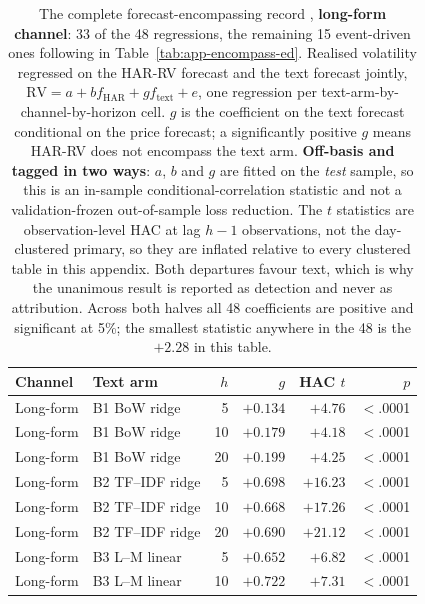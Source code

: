\begin{table}[p]
\centering
\caption[The 48 encompassing regressions, long-form half]{The complete
forecast-encompassing record \cite{harvey1998encompassing}, \textbf{long-form
channel}: 33 of the 48 regressions, the remaining 15 event-driven ones
following in Table~\ref{tab:app-encompass-ed}. Realised
volatility regressed on the HAR-RV forecast and the text forecast jointly,
$\mathrm{RV} = a + b f_{\mathrm{HAR}} + g f_{\mathrm{text}} + e$, one
regression per text-arm-by-channel-by-horizon cell. $g$ is the coefficient
on the text forecast conditional on the price forecast; a significantly
positive $g$ means HAR-RV does not encompass the text arm.
\textbf{Off-basis and tagged in two ways}: $a$, $b$ and $g$ are fitted on
the \emph{test} sample, so this is an in-sample conditional-correlation
statistic and not a validation-frozen out-of-sample loss reduction. The
$t$ statistics are observation-level HAC at lag $h-1$ observations, not the
day-clustered primary, so they are inflated relative to every clustered
table in this appendix. Both departures favour text, which is why the
unanimous result is reported as detection and never as attribution. Across
both halves all 48 coefficients are positive and significant at 5\%; the
smallest statistic anywhere in the 48 is the $+2.28$ in this table.}
\label{tab:app-encompass}
\singlespacing\footnotesize
\setlength{\tabcolsep}{4pt}
\begin{tabular}{@{}llrrrr@{}}
\toprule
Channel & Text arm & $h$ & $g$ & HAC $t$ & $p$ \\
\midrule
Long-form & B1 BoW ridge & 5 & $+0.134$ & $+4.76$ & $<$.0001 \\
Long-form & B1 BoW ridge & 10 & $+0.179$ & $+4.18$ & $<$.0001 \\
Long-form & B1 BoW ridge & 20 & $+0.199$ & $+4.25$ & $<$.0001 \\
\addlinespace
Long-form & B2 TF--IDF ridge & 5 & $+0.698$ & $+16.23$ & $<$.0001 \\
Long-form & B2 TF--IDF ridge & 10 & $+0.668$ & $+17.26$ & $<$.0001 \\
Long-form & B2 TF--IDF ridge & 20 & $+0.690$ & $+21.12$ & $<$.0001 \\
\addlinespace
Long-form & B3 L--M linear & 5 & $+0.652$ & $+6.82$ & $<$.0001 \\
Long-form & B3 L--M linear & 10 & $+0.722$ & $+7.31$ & $<$.0001 \\

\end{tabular}
\end{table}
